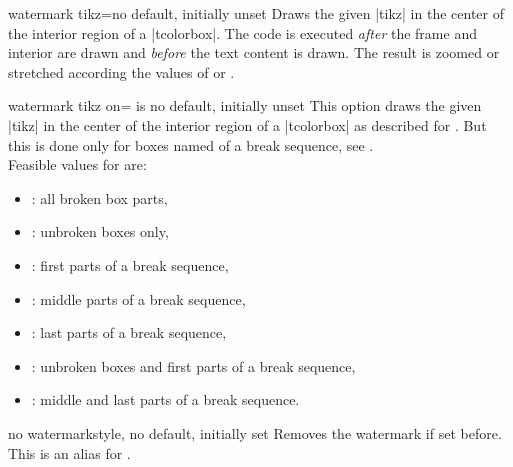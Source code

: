 \clearpage
\begin{docTcbKey}{watermark tikz}{=}{no default, initially unset}
  Draws the given |tikz| 
  in the center of the interior region of a |tcolorbox|.
  The code is executed \emph{after} the
  frame and interior are drawn and \emph{before} the text content is drawn.
  The result is zoomed or stretched according the values of
   or .
\begin{dispExample}

\begin{tcolorbox}[enhanced,title=My title,
  watermark tikz={\draw[line width=2mm] circle (1cm)
    node{\fontfamily{ptm}\fontseries{b}\fontsize{20mm}{20mm}\selectfont ?};}]
\lipsum[1]
\tcblower
\lipsum[2]
\end{tcolorbox}
\end{dispExample}
\end{docTcbKey}



\begin{docTcbKey}{watermark tikz on}{= is }{no default, initially unset}
  This option draws the given |tikz|  in the center of the interior region of a |tcolorbox|
  as described for .
  But this is done only for boxes named  of a break sequence, see
  .\\ 
  Feasible values for  are:
  \begin{itemize}
  \item{}: all broken box parts,
  \item{}: unbroken boxes only,
  \item{}: first parts of a break sequence,
  \item{}: middle parts of a break sequence,
  \item{}: last parts of a break sequence,
  \item{}: unbroken boxes and first parts of a break sequence,
  \item{}: middle and last parts of a break sequence.
  \end{itemize}
\end{docTcbKey}


\begin{docTcbKey}{no watermark}{}{style, no default, initially set}
  Removes the watermark if set before. This is an alias for
  .
\end{docTcbKey}


